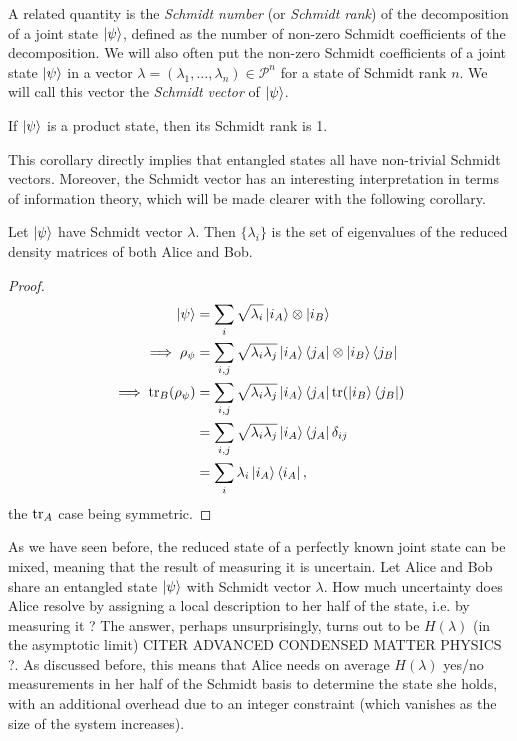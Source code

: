 A related quantity is the \textit{Schmidt number} (or \textit{Schmidt rank}) of the decomposition of a joint state $\ket{\psi}$, defined as the number of non-zero Schmidt coefficients of the decomposition. We will also often put the non-zero Schmidt coefficients of a joint state $\ket{\psi}$ in a vector $\lambda = (\lambda_1, \dots, \lambda_n) \in \mathcal{P}^n$ for a state of Schmidt rank $n$. We will call this vector the \textit{Schmidt vector} of $\ket{\psi}$.

\begin{corollary}
    If $\ket{\psi}$ is a product state, then its Schmidt rank is 1.
\end{corollary}

This corollary directly implies that entangled states all have non-trivial Schmidt vectors. Moreover, the Schmidt vector has an interesting interpretation in terms of information theory, which will be made clearer with the following corollary.

\begin{corollary} \label{cor:reduced_schmidt} %
    Let $\ket{\psi}$ have Schmidt vector $\lambda$. Then $\{\lambda_i\}$ is the set of eigenvalues of the reduced density matrices of both Alice and Bob.
\end{corollary}

\begin{proof}
    \begin{align}
        \ket{\psi} &= \sum_{i} \sqrt{\lambda_i} \ket{i_A} \otimes \ket{i_B}\\
        \implies \rho_\psi &= \sum_{i, j} \sqrt{\lambda_i \lambda_j} \ket{i_A}\bra{j_A} \otimes \ket{i_B}\bra{j_B}\\
        \implies \operatorname{tr}_B(\rho_\psi) &= \sum_{i, j} \sqrt{\lambda_i \lambda_j} \ket{i_A}\bra{j_A} \operatorname{tr}(\ket{i_B} \bra{j_B})\\
                                  &= \sum_{i, j} \sqrt{\lambda_i \lambda_j} \ket{i_A}\bra{j_A} \delta_{ij}\\
                                  &= \sum_{i} \lambda_i \ket{i_A}\bra{i_A},
    \end{align}
    the $\operatorname{tr}_A$ case being symmetric. \qedhere
\end{proof}

As we have seen before, the reduced state of a perfectly known joint state can be mixed, meaning that the result of measuring it is uncertain. Let Alice and Bob share an entangled state $\ket{\psi}$ with Schmidt vector $\lambda$. How much uncertainty does Alice resolve by assigning a local description to her half of the state, i.e. by measuring it ? The answer, perhaps unsurprisingly, turns out to be $H(\lambda)$ (in the asymptotic limit) CITER ADVANCED CONDENSED MATTER PHYSICS ?. As discussed before, this means that Alice needs on average $H(\lambda)$ yes/no measurements in her half of the Schmidt basis to determine the state she holds, with an additional overhead due to an integer constraint (which vanishes as the size of the system increases).



